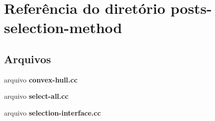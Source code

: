 \section{Referência do diretório posts-\/selection-\/method}
\label{dir_61e6ebc25032e58420658ff056188c9e}
\subsection*{Arquivos}
\begin{DoxyCompactItemize}
\item 
arquivo {\bf convex-\/hull.\+cc}
\item 
arquivo {\bf select-\/all.\+cc}
\item 
arquivo {\bf selection-\/interface.\+cc}
\end{DoxyCompactItemize}
